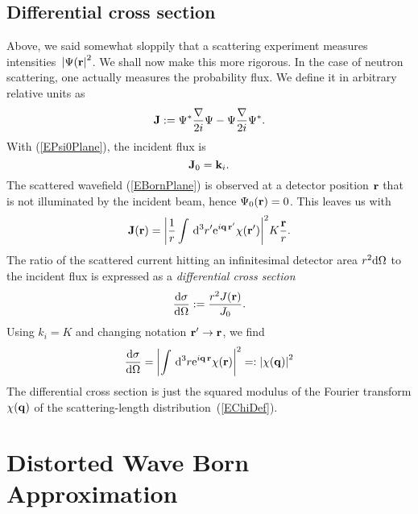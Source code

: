 \subsection{Differential cross section}

Above, we said somewhat sloppily
that a scattering experiment measures intensities~${|\Psi(\mathbf{r}|}^2$.
We shall now make this more rigorous.
In the case of neutron scattering,
one actually measures the probability flux.
We define it in arbitrary relative units as
\begin{equation}
  \mathbf{J} := \Psi^*\frac{\mathbf{\nabla}}{2i}\Psi - \Psi\frac{\mathbf{\nabla}}{2i}\Psi^*.
\end{equation}
With (\ref{EPsi0Plane}), the incident flux is
\begin{equation}
  \mathbf{J}_0 = \mathbf{k}_i.
\end{equation}
The scattered wavefield (\ref{EBornPlane}) is observed
at a detector position $\mathbf{r}$ that is not illuminated by the
incident beam, hence $\Psi_0(\mathbf{r})=0$.
This leaves us with
\begin{equation}
  \mathbf{J}(\mathbf{r})
  = {\left|\frac{1}{r}
    \int\,{\rm d}^3r' {\rm e}^{i\mathbf{q}\,\mathbf{r'}}\chi(\mathbf{r'})
    \right|}^2 K\frac{\mathbf{r}}{r}.
\end{equation}
The ratio of the scattered current hitting an infinitesimal detector area
$r^2{\rm d}\Omega$ to the incident flux is expressed as a
\textit{differential cross section}
\begin{equation}
  \frac{{\rm d}\sigma}{{\rm d}\Omega}
  := \frac{r^2 J(\mathbf{r})}{J_0}.
\end{equation}
Using $k_i=K$ and changing notation $\mathbf{r'}\to\mathbf{r}$,
we find
\begin{equation}
  \frac{{\rm d}\sigma}{{\rm d}\Omega}
  = {\left|
    \int\,{\rm d}^3r {\rm e}^{i\mathbf{q}\,\mathbf{r}}\chi(\mathbf{r})
    \right|}^2 =: {\left| \chi(\mathbf{q}) \right|}^2
\end{equation}
The differential cross section is just the squared modulus
of the Fourier transform $\chi(\mathbf{q})$
of the scattering-length distribution~(\ref{EChiDef}).


\section{Distorted Wave Born Approximation}\label{Sdwba}

